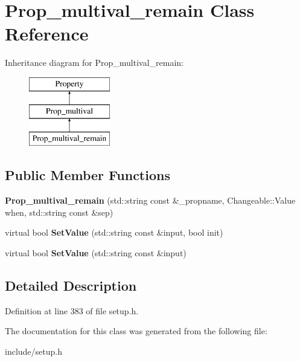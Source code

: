 \hypertarget{classProp__multival__remain}{\section{Prop\-\_\-multival\-\_\-remain Class Reference}
\label{classProp__multival__remain}
}
Inheritance diagram for Prop\-\_\-multival\-\_\-remain\-:\begin{figure}[H]
\begin{center}
\leavevmode
\includegraphics[height=3.000000cm]{classProp__multival__remain}
\end{center}
\end{figure}
\subsection*{Public Member Functions}
\begin{DoxyCompactItemize}
\item 
\hypertarget{classProp__multival__remain_a59450ef7be09d83d29831c5c378d79ad}{{\bfseries Prop\-\_\-multival\-\_\-remain} (std\-::string const \&\-\_\-propname, Changeable\-::\-Value when, std\-::string const \&sep)}\label{classProp__multival__remain_a59450ef7be09d83d29831c5c378d79ad}

\item 
\hypertarget{classProp__multival__remain_af3b82ec8413acbdc8266eb70c03b9029}{virtual bool {\bfseries Set\-Value} (std\-::string const \&input, bool init)}\label{classProp__multival__remain_af3b82ec8413acbdc8266eb70c03b9029}

\item 
\hypertarget{classProp__multival__remain_ac6f943a59a58acf45efe4c0ee51f3948}{virtual bool {\bfseries Set\-Value} (std\-::string const \&input)}\label{classProp__multival__remain_ac6f943a59a58acf45efe4c0ee51f3948}

\end{DoxyCompactItemize}


\subsection{Detailed Description}


Definition at line 383 of file setup.\-h.



The documentation for this class was generated from the following file\-:\begin{DoxyCompactItemize}
\item 
include/setup.\-h\end{DoxyCompactItemize}

